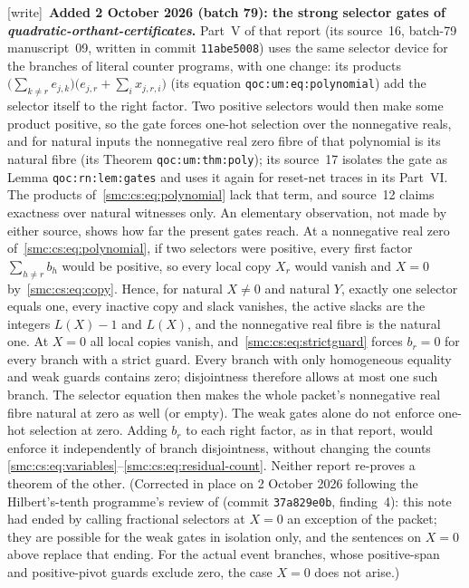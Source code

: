 \documentclass[11pt,letterpaper]{article}
\numberwithin{equation}{section}
\theoremstyle{definition}
\theoremstyle{remark}
\newcommand{\wtag}{\textup{[write]}}
\begin{document}
\wtag\ \textbf{Added 2 October 2026 (batch 79): the strong selector gates of \emph{quadratic-orthant-certificates}.} Part~V of that report (its source~16, batch-79 manuscript~09, written in commit \texttt{11abe5008}) uses the same selector device for the branches of literal counter programs, with one change: its products $\bigl(\sum_{k\ne r}e_{j,k}\bigr)\bigl(e_{j,r}+\sum_i x_{j,r,i}\bigr)$ (its equation \texttt{qoc:um:eq:polynomial}) add the selector itself to the right factor. Two positive selectors would then make some product positive, so the gate forces one-hot selection over the nonnegative reals, and for natural inputs the nonnegative real zero fibre of that polynomial is its natural fibre (its Theorem \texttt{qoc:um:thm:poly}); its source~17 isolates the gate as Lemma \texttt{qoc:rn:lem:gates} and uses it again for reset-net traces in its Part~VI. The products of~\eqref{smc:cs:eq:polynomial} lack that term, and source~12 claims exactness over natural witnesses only. An elementary observation, not made by either source, shows how far the present gates reach. At a nonnegative real zero of~\eqref{smc:cs:eq:polynomial}, if two selectors were positive, every first factor $\sum_{h\ne r}b_h$ would be positive, so every local copy $X_r$ would vanish and $X=0$ by~\eqref{smc:cs:eq:copy}. Hence, for natural $X\ne0$ and natural $Y$, exactly one selector equals one, every inactive copy and slack vanishes, the active slacks are the integers $L(X)-1$ and $L(X)$, and the nonnegative real fibre is the natural one. At $X=0$ all local copies vanish, and~\eqref{smc:cs:eq:strictguard} forces $b_r=0$ for every branch with a strict guard. Every branch with only homogeneous equality and weak guards contains zero; disjointness therefore allows at most one such branch. The selector equation then makes the whole packet's nonnegative real fibre natural at zero as well (or empty). The weak gates alone do not enforce one-hot selection at zero. Adding $b_r$ to each right factor, as in that report, would enforce it independently of branch disjointness, without changing the counts \eqref{smc:cs:eq:variables}--\eqref{smc:cs:eq:residual-count}. Neither report re-proves a theorem of the other. (Corrected in place on 2 October 2026 following the Hilbert's-tenth programme's review  of  (commit \texttt{37a829e0b}, finding~4): this note had ended by calling fractional selectors at $X=0$ an exception of the packet; they are possible for the weak gates in isolation only, and the sentences on $X=0$ above replace that ending. For the actual event branches, whose positive-span and positive-pivot guards exclude zero, the case $X=0$ does not arise.)
\end{document}
